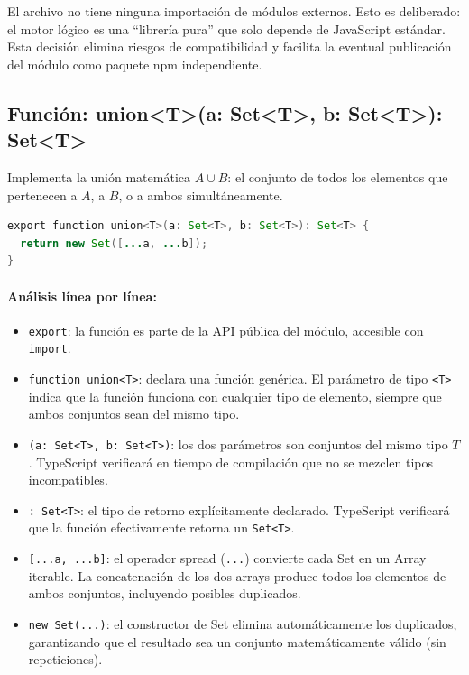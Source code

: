 \documentclass[11pt,a4paper]{article}
\begin{document}
El archivo no tiene ninguna importación de módulos externos. Esto es deliberado: el motor lógico es una ``librería pura'' que solo depende de JavaScript estándar. Esta decisión elimina riesgos de compatibilidad y facilita la eventual publicación del módulo como paquete npm independiente.

\subsection{Función: union\textless{}T\textgreater{}(a: Set\textless{}T\textgreater{}, b: Set\textless{}T\textgreater{}): Set\textless{}T\textgreater{}}
Implementa la unión matemática $A \cup B$: el conjunto de todos los elementos que pertenecen a $A$, a $B$, o a ambos simultáneamente.

\begin{lstlisting}[language=Java, caption={operations.ts - función union}]
export function union<T>(a: Set<T>, b: Set<T>): Set<T> {
  return new Set([...a, ...b]);
}
\end{lstlisting}

\paragraph{Análisis línea por línea:}
\begin{itemize}[noitemsep]
    \item \texttt{export}: la función es parte de la API pública del módulo, accesible con \texttt{import}.
    \item \texttt{function union<T>}: declara una función genérica. El parámetro de tipo \texttt{<T>} indica que la función funciona con cualquier tipo de elemento, siempre que ambos conjuntos sean del mismo tipo.
    \item \texttt{(a: Set<T>, b: Set<T>)}: los dos parámetros son conjuntos del mismo tipo $T$. TypeScript verificará en tiempo de compilación que no se mezclen tipos incompatibles.
    \item \texttt{: Set<T>}: el tipo de retorno explícitamente declarado. TypeScript verificará que la función efectivamente retorna un \texttt{Set<T>}.
    \item \texttt{[...a, ...b]}: el operador spread (\texttt{...}) convierte cada Set en un Array iterable. La concatenación de los dos arrays produce todos los elementos de ambos conjuntos, incluyendo posibles duplicados.
    \item \texttt{new Set(...)}: el constructor de Set elimina automáticamente los duplicados, garantizando que el resultado sea un conjunto matemáticamente válido (sin repeticiones).
\end{itemize}
\end{document}

